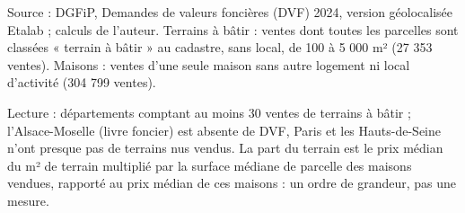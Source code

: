 Source : DGFiP, Demandes de valeurs foncières (DVF) 2024, version géolocalisée Etalab ; calculs de l'auteur. Terrains à bâtir : ventes dont toutes les parcelles sont classées « terrain à bâtir » au cadastre, sans local, de 100 à 5 000 m² (27 353 ventes). Maisons : ventes d'une seule maison sans autre logement ni local d'activité (304 799 ventes).\par Lecture : départements comptant au moins 30 ventes de terrains à bâtir ; l'Alsace-Moselle (livre foncier) est absente de DVF, Paris et les Hauts-de-Seine n'ont presque pas de terrains nus vendus. La part du terrain est le prix médian du m² de terrain multiplié par la surface médiane de parcelle des maisons vendues, rapporté au prix médian de ces maisons : un ordre de grandeur, pas une mesure.
